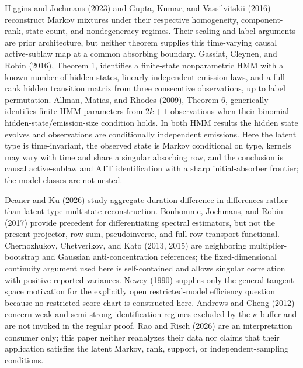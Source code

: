 Higgins and Jochmans (2023) and Gupta, Kumar, and Vassilvitskii (2016) reconstruct Markov mixtures under their respective homogeneity, component-rank, state-count, and nondegeneracy regimes.  Their scaling and label arguments are prior architecture, but neither theorem supplies this time-varying causal active-sublaw map at a common absorbing boundary.  Gassiat, Cleynen, and Robin (2016), Theorem 1, identifies a finite-state nonparametric HMM with a known number of hidden states, linearly independent emission laws, and a full-rank hidden transition matrix from three consecutive observations, up to label permutation.  Allman, Matias, and Rhodes (2009), Theorem 6, generically identifies finite-HMM parameters from \(2k+1\) observations when their binomial hidden-state/emission-size condition holds.  In both HMM results the hidden state evolves and observations are conditionally independent emissions.  Here the latent type is time-invariant, the observed state is Markov conditional on type, kernels may vary with time and share a singular absorbing row, and the conclusion is causal active-sublaw and ATT identification with a sharp initial-absorber frontier; the model classes are not nested.

Deaner and Ku (2026) study aggregate duration difference-in-differences rather than latent-type multistate reconstruction.  Bonhomme, Jochmans, and Robin (2017) provide precedent for differentiating spectral estimators, but not the present projector, row-sum, pseudoinverse, and full-row transport functional.  Chernozhukov, Chetverikov, and Kato (2013, 2015) are neighboring multiplier-bootstrap and Gaussian anti-concentration references; the fixed-dimensional continuity argument used here is self-contained and allows singular correlation with positive reported variances.  Newey (1990) supplies only the general tangent-space motivation for the explicitly open restricted-model efficiency question because no restricted score chart is constructed here.  Andrews and Cheng (2012) concern weak and semi-strong identification regimes excluded by the \(\kappa\)-buffer and are not invoked in the regular proof.  Rao and Risch (2026) are an interpretation consumer only; this paper neither reanalyzes their data nor claims that their application satisfies the latent Markov, rank, support, or independent-sampling conditions.

